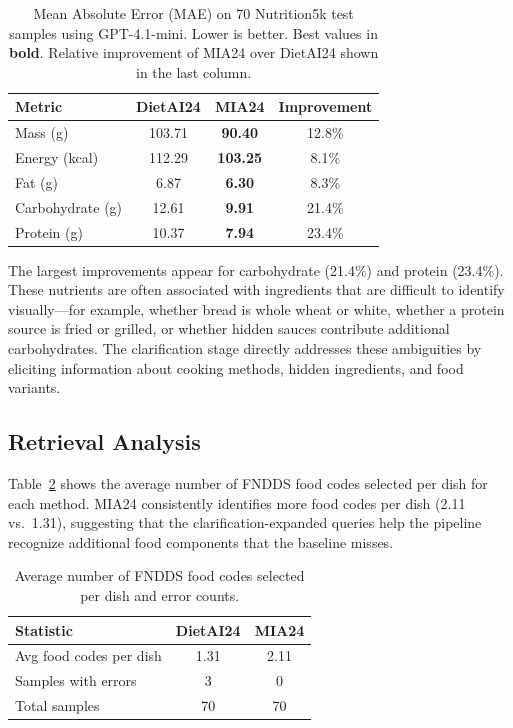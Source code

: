 \documentclass[11pt]{article}
\begin{document}
\begin{table}[H]
\centering
\caption{Mean Absolute Error (MAE) on 70 Nutrition5k test samples using GPT-4.1-mini. Lower is better. Best values in \textbf{bold}. Relative improvement of MIA24 over DietAI24 shown in the last column.}
\label{tab:main_results}
\vspace{0.5em}
\begin{tabular}{lccc}
\toprule
\textbf{Metric} & \textbf{DietAI24} & \textbf{MIA24} & \textbf{Improvement} \\
\midrule
Mass (g)          & 103.71  & \textbf{90.40}   & 12.8\% \\
Energy (kcal)     & 112.29  & \textbf{103.25}  & 8.1\%  \\
Fat (g)           & 6.87    & \textbf{6.30}    & 8.3\%  \\
Carbohydrate (g)  & 12.61   & \textbf{9.91}    & 21.4\% \\
Protein (g)       & 10.37   & \textbf{7.94}    & 23.4\% \\
\bottomrule
\end{tabular}
\end{table}

The largest improvements appear for carbohydrate (21.4\%) and protein (23.4\%).
These nutrients are often associated with ingredients that are difficult to identify visually---for example, whether bread is whole wheat or white, whether a protein source is fried or grilled, or whether hidden sauces contribute additional carbohydrates.
The clarification stage directly addresses these ambiguities by eliciting information about cooking methods, hidden ingredients, and food variants.

\subsection{Retrieval Analysis}

Table~\ref{tab:food_codes} shows the average number of FNDDS food codes selected per dish for each method.
MIA24 consistently identifies more food codes per dish (2.11 vs.\ 1.31), suggesting that the clarification-expanded queries help the pipeline recognize additional food components that the baseline misses.

\begin{table}[H]
\centering
\caption{Average number of FNDDS food codes selected per dish and error counts.}
\label{tab:food_codes}
\vspace{0.5em}
\begin{tabular}{lcc}
\toprule
\textbf{Statistic} & \textbf{DietAI24} & \textbf{MIA24} \\
\midrule
Avg food codes per dish & 1.31 & 2.11 \\
Samples with errors     & 3    & 0    \\
Total samples           & 70   & 70   \\
\bottomrule
\end{tabular}
\end{table}
\end{document}
